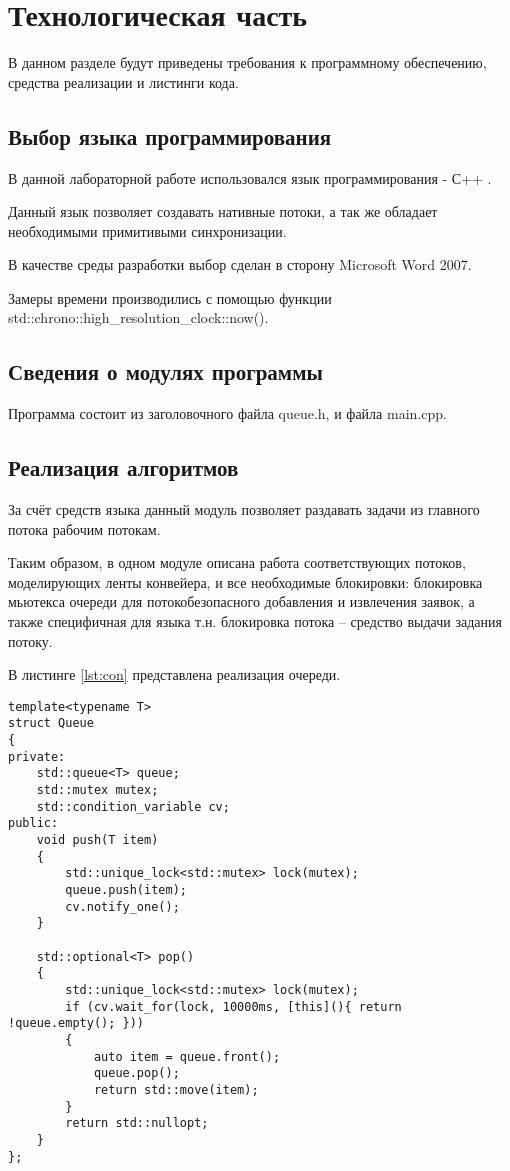 \chapter{Технологическая часть}
В данном разделе будут приведены требования к программному обеспечению, средства реализации и листинги кода.

\section{Выбор языка программирования}

В данной лабораторной работе использовался язык программирования - С++ \cite{csharplang}.

Данный язык позволяет создавать нативные потоки, а так же обладает необходимыми примитивыми синхронизации.

В качестве среды разработки выбор сделан в сторону Microsoft Word 2007\cite{wind}. 

Замеры времени производились с помощью функции std::chrono::high\_resolution\_clock::now().

\section{Сведения о модулях программы}
Программа состоит из заголовочного файла queue.h, и файла main.cpp.

\section{Реализация алгоритмов}

За счёт средств языка данный модуль позволяет раздавать задачи из главного потока рабочим потокам. 

Таким образом, в одном модуле описана работа соответствующих потоков, моделирующих ленты конвейера, и все необходимые блокировки: блокировка мьютекса очереди для потокобезопасного добавления и извлечения заявок, а также специфичная для языка т.н. блокировка потока -- средство выдачи задания потоку.


В листинге \ref{lst:con} представлена реализация очереди.

\captionsetup{singlelinecheck = false, justification=raggedright}
\begin{lstlisting}[label=lst:con,caption=Реализация очереди]
template<typename T>
struct Queue
{
private:
    std::queue<T> queue;
    std::mutex mutex;
    std::condition_variable cv;
public:
    void push(T item)
    {
        std::unique_lock<std::mutex> lock(mutex);
        queue.push(item);
        cv.notify_one();
    }

    std::optional<T> pop()
    {
        std::unique_lock<std::mutex> lock(mutex);
        if (cv.wait_for(lock, 10000ms, [this](){ return !queue.empty(); }))
        {
            auto item = queue.front();
            queue.pop();
            return std::move(item);
        }
        return std::nullopt;
    }
};
\end{lstlisting}


